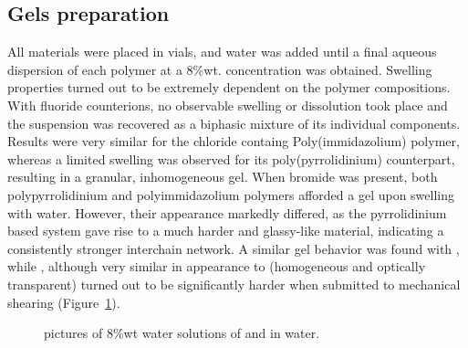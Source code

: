 \documentclass[journal=jacsat,manuscript=article]{achemso}
\begin{document}
\subsection{Gels preparation}
All materials were placed in vials, and water was added until a final aqueous dispersion of each polymer at a 8\%wt. concentration was obtained. Swelling properties turned out to be extremely dependent on the polymer compositions. With fluoride counterions, no observable swelling or dissolution took place and the suspension was recovered as a biphasic mixture of its individual components. Results were very similar for the chloride containg Poly(immidazolium) polymer, whereas a limited swelling was observed for its poly(pyrrolidinium) counterpart, resulting in a granular, inhomogeneous gel. When bromide was present, both polypyrrolidinium and polyimmidazolium polymers afforded a gel upon swelling with water. However, their appearance markedly differed, as the pyrrolidinium based system gave rise to a much harder and glassy-like material, indicating a consistently stronger interchain network. A similar gel behavior was found with , while , although very similar in appearance to  (homogeneous and optically transparent) turned out to be significantly harder when submitted to mechanical shearing (Figure~\ref{fig:pictures}).

\begin{figure}
\caption{pictures of 8\%wt water solutions of  and  in water.}
\label{fig:pictures}
\end{figure}
\end{document}
